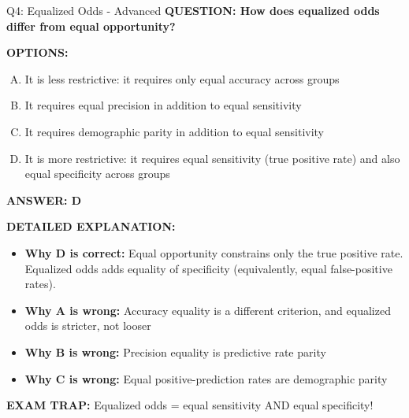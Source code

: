 \documentclass[8pt]{beamer}
\begin{document}
\begin{frame}[shrink=6]{Q4: Equalized Odds - Advanced}
\fontsize{6.5}{7.5}\selectfont
\textbf{QUESTION: How does equalized odds differ from equal opportunity?}

\vspace{0.1cm}
\textbf{OPTIONS:}
\begin{enumerate}[A.]
\item It is less restrictive: it requires only equal accuracy across groups
\item It requires equal precision in addition to equal sensitivity
\item It requires demographic parity in addition to equal sensitivity
\item It is more restrictive: it requires equal sensitivity (true positive rate) and also equal specificity across groups
\end{enumerate}

\vspace{0.1cm}
\textcolor{myblue}{\textbf{ANSWER: D}}

\vspace{0.1cm}
\textbf{DETAILED EXPLANATION:}
\begin{itemize}
\item \textbf{Why D is correct:} Equal opportunity constrains only the true positive rate. Equalized odds adds equality of specificity (equivalently, equal false-positive rates).
\item \textbf{Why A is wrong:} Accuracy equality is a different criterion, and equalized odds is stricter, not looser
\item \textbf{Why B is wrong:} Precision equality is predictive rate parity
\item \textbf{Why C is wrong:} Equal positive-prediction rates are demographic parity
\end{itemize}

\textcolor{myred}{\textbf{EXAM TRAP:}} Equalized odds = equal sensitivity AND equal specificity!
\end{frame}
\end{document}
